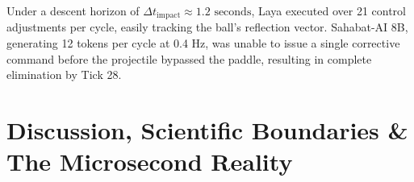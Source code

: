 \documentclass[journal,compsoc]{IEEEtran}
\begin{document}
\begin{table}[t]
\centering
\caption{Dynamic Continuous Trajectory Tracking Performance (Brick Breaker)}
\label{tab:breakout}
\end{table}

Under a descent horizon of $\Delta t_{\text{impact}} \approx 1.2 \text{ seconds}$, Laya executed over 21 control adjustments per cycle, easily tracking the ball's reflection vector. Sahabat-AI 8B, generating 12 tokens per cycle at 0.4 Hz, was unable to issue a single corrective command before the projectile bypassed the paddle, resulting in complete elimination by Tick 28.

\section{Discussion, Scientific Boundaries \& The Microsecond Reality}
\end{document}
